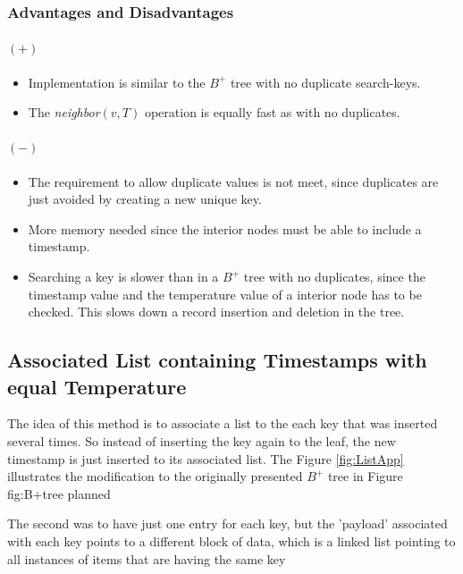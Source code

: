 \documentclass[abstracton,12pt]{scrreprt}
\begin{document}
\subsubsection{Advantages and Disadvantages}
\paragraph{$(+)$}
\begin{itemize}  
	\item Implementation is similar to the $B^+$ tree with no duplicate search-keys. 
	\item The \emph{neighbor}$(v,T)$ operation is equally fast as with no duplicates. 
\end{itemize}
\paragraph{$(-)$}
\begin{itemize}  
	\item The requirement to allow duplicate values is not meet, since duplicates are just avoided by creating a new unique key. 
	\item More memory needed since the interior nodes must be able to include a timestamp. 
	\item Searching a key is slower than in a $B^+$ tree with no duplicates, since the timestamp value and the temperature value of a interior node has to be checked. This slows down a record insertion and deletion in the tree. 
\end{itemize}

\subsection{Associated List containing Timestamps with equal Temperature}
The idea of this method is to associate a list to the each key that was inserted several times. So instead of inserting the key again to the leaf, the new timestamp is just inserted to its associated list. The Figure \ref{fig:ListApp} illustrates the modification to the originally presented $B^+$ tree in Figure {fig:B+tree} planned


The second was to have just one entry for each key, but the 'payload' associated with each key points to a different block of data, which is a linked list pointing to all instances of items that are having the same key
\end{document}
